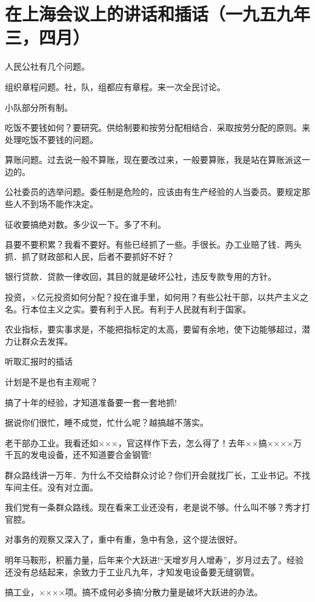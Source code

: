 \section[在上海会议上的讲话和插话（一九五九年三，四月）]{在上海会议上的讲话和插话（一九五九年三，四月）}


人民公社有几个问题。

组织章程问题。社，队，组都应有章程。来一次全民讨论。

小队部分所有制。

吃饭不要钱如何？要研究。供给制要和按劳分配相结合．采取按劳分配的原则。来处理吃饭不要钱的问题。

算账问题。过去说一般不算账，现在要改过来，一般要算账，我是站在算账派这一边的。

公社委员的选举问题。委任制是危险的，应该由有生产经验的人当委员。要规定那些人不到场不能作决定。

征收要搞绝对数。多少议一下。多了不利。

县要不要积累？我看不要好。有些已经抓了一些。手很长。办工业赔了钱．两头抓．抓了财政部和人民，后者不要抓好不好？

银行贷款．贷款一律收回，其目的就是破坏公社，违反专款专用的方针。

投资，×亿元投资如何分配？投在谁手里，如何用？有些公社干部，以共产主义之名。行本位主义之实。要有利于人民。有利于人民就有利于国家。

农业指标，要实事求是，不能把指标定的太高，要留有余地，使下边能够超过，潜力让群众去发挥。

听取汇报时的插话

计划是不是也有主观呢？

搞了十年的经验，才知道准备要一套一套地抓!

据说你们很忙，睡不成觉，忙什么呢？越搞越不落实。

老干部办工业。我看还如×××，官这样作下去，怎么得了！去年××搞××××万千瓦的发电设备，还不知道要合金钢管!

群众路线讲一万年．为什么不交给群众讨论？你们开会就找厂长，工业书记。不找车间主任。没有对立面。

我们党有一条群众路线。现在看来工业还没有，老是说不够。什么叫不够？秀才打官腔。

对事务的观察又深入了，重中有重，急中有急，这个提法很好。

明年马鞍形，积蓄力量，后年来个大跃进!“天增岁月人增寿”，岁月过去了。经验还没有总结起来，余致力于工业凡九年，才知发电设备要无缝钢管。

搞工业，××××项。搞不成何必多搞!分散力量是破坏大跃进的办法。

